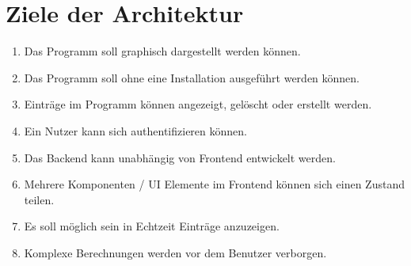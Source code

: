 \chapter{Ziele der Architektur}


\begin{enumerate}
    \item Das Programm soll graphisch dargestellt werden können.
    \item Das Programm soll ohne eine Installation ausgeführt werden können.
    \item Einträge im Programm können angezeigt, gelöscht oder erstellt werden.
    \item Ein Nutzer kann sich authentifizieren können.
    \item Das Backend kann unabhängig von Frontend entwickelt werden.
    \item Mehrere Komponenten / UI Elemente im Frontend können sich einen Zustand teilen.
    \item Es soll möglich sein in Echtzeit Einträge anzuzeigen.
    \item Komplexe Berechnungen werden vor dem Benutzer verborgen.
\end{enumerate}
        
